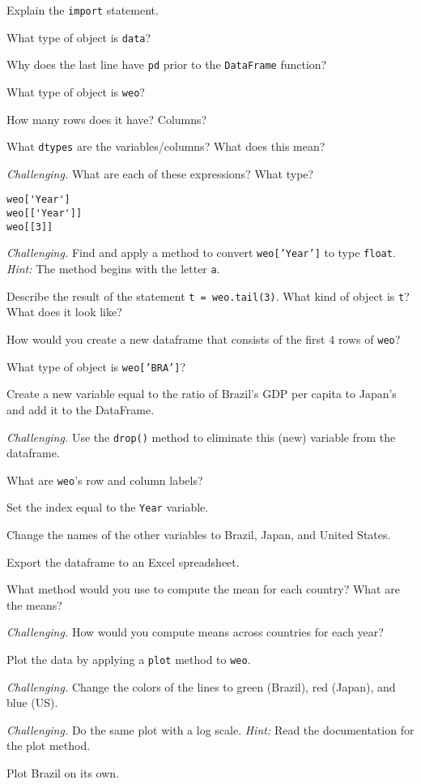 \documentclass[11pt]{exam}
\begin{document}
\begin{questions}
\begin{parts}
\item Explain the \texttt{import} statement.
\item What type of object is {\tt data}?
\item Why does the last line have {\tt pd} prior to the {\tt DataFrame} function?
\item What type of object is {\tt weo}?
\item How many rows does it have?  Columns?
\item What {\tt dtypes} are the variables/columns?  What does this mean?
\item {\it Challenging.\/}
What are each of these expressions?  What type?
\begin{verbatim}
weo['Year']
weo[['Year']]
weo[[3]]
\end{verbatim}
\item {\it Challenging.\/}
Find and apply a method to convert {\tt weo['Year']} to type {\tt float}.
{\it Hint:\/} The method begins with the letter {\tt a}.
\item Describe the result of the statement \texttt{t = weo.tail(3)}.
What kind of object is \texttt{t}?  What does it look like?
\item How would you create a new dataframe that consists of the first 4 rows of \texttt{weo}?
\item What type of object is \texttt{weo['BRA']}?
\item Create a new variable equal to the ratio of Brazil's GDP per capita to Japan's and add it to the DataFrame.
\item {\it Challenging.\/}
Use the {\tt drop()} method to eliminate this (new) variable from the dataframe.
\item What are {\tt weo}'s row and column labels?
\item Set the index equal to the {\tt Year} variable.
\item Change the names of the other variables to Brazil, Japan, and United States.
\item Export the dataframe to an Excel spreadsheet.
\item What method would you use to compute the mean for each country?
What are the means?
\item {\it Challenging.\/}
How would you compute means across countries for each year?
\item Plot the data by applying a {\tt plot} method to {\tt weo}.
\item {\it Challenging.\/} Change the colors of the lines to green (Brazil), red (Japan),
and blue (US).
\item {\it Challenging.\/}
Do the same plot with a log scale.
{\it Hint:\/} Read the documentation for the plot method.
\item Plot Brazil on its own.
\end{parts}


\end{questions}
\end{document}

